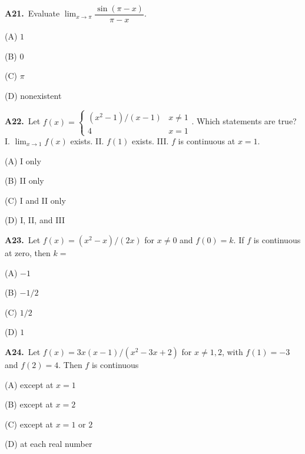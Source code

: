 \documentclass[11pt]{article}
\begin{document}
\bigskip\noindent\textbf{A21.}\ Evaluate $\displaystyle\lim_{x\to\pi}\dfrac{\sin(\pi-x)}{\pi-x}$.
\begin{list}{}{\setlength{\leftmargin}{3em}\setlength{\labelwidth}{2.5em}\setlength{\itemsep}{0pt}\setlength{\topsep}{2pt}}
\item[(A)] $1$
\item[(B)] $0$
\item[(C)] $\pi$
\item[(D)] nonexistent
\end{list}

\bigskip\noindent\textbf{A22.}\ Let $f(x)=\begin{cases}(x^2-1)/(x-1)&x\ne1\\4&x=1\end{cases}$. Which statements are true? I. $\lim_{x\to1}f(x)$ exists. II. $f(1)$ exists. III. $f$ is continuous at $x=1$.
\begin{list}{}{\setlength{\leftmargin}{3em}\setlength{\labelwidth}{2.5em}\setlength{\itemsep}{0pt}\setlength{\topsep}{2pt}}
\item[(A)] I only
\item[(B)] II only
\item[(C)] I and II only
\item[(D)] I, II, and III
\end{list}

\bigskip\noindent\textbf{A23.}\ Let $f(x)=(x^2-x)/(2x)$ for $x\ne0$ and $f(0)=k$. If $f$ is continuous at zero, then $k=$
\begin{list}{}{\setlength{\leftmargin}{3em}\setlength{\labelwidth}{2.5em}\setlength{\itemsep}{0pt}\setlength{\topsep}{2pt}}
\item[(A)] $-1$
\item[(B)] $-1/2$
\item[(C)] $1/2$
\item[(D)] $1$
\end{list}

\bigskip\noindent\textbf{A24.}\ Let $f(x)=3x(x-1)/(x^2-3x+2)$ for $x\ne1,2$, with $f(1)=-3$ and $f(2)=4$. Then $f$ is continuous
\begin{list}{}{\setlength{\leftmargin}{3em}\setlength{\labelwidth}{2.5em}\setlength{\itemsep}{0pt}\setlength{\topsep}{2pt}}
\item[(A)] except at $x=1$
\item[(B)] except at $x=2$
\item[(C)] except at $x=1$ or $2$
\item[(D)] at each real number
\end{list}
\end{document}
